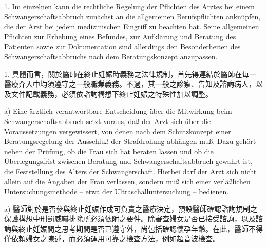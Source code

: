 \documentclass[12pt]{article}
\begin{document}
\begin{sourcepara}[title={原文D.133}]
1. Im einzelnen kann die rechtliche Regelung der Pflichten des Arztes bei einem Schwangerschaftsabbruch zunächst an die allgemeinen Berufspflichten anknüpfen, die der Arzt bei jedem medizinischen Eingriff zu beachten hat. Seine allgemeinen Pflichten zur Erhebung eines Befundes, zur Aufklärung und Beratung des Patienten sowie zur Dokumentation sind allerdings den Besonderheiten des Schwangerschaftsabbruchs nach dem Beratungskonzept anzupassen.
\end{sourcepara}
\begin{transpara}
1. 具體而言，關於醫師在終止妊娠時義務之法律規制，首先得連結於醫師在每一醫療介入中均須遵守之一般職業義務。不過，其一般之診察、告知及諮詢病人，以及文件記載義務，必須依諮詢構想下終止妊娠之特殊性加以調整。
\end{transpara}

\begin{sourcepara}[title={原文D.134}]
a) Eine ärztlich verantwortbare Entscheidung über die Mitwirkung beim Schwangerschaftsabbruch setzt voraus, daß der Arzt sich über die Voraussetzungen vergewissert, von denen nach dem Schutzkonzept einer Beratungsregelung der Ausschluß der Strafdrohung abhängen muß. Dazu gehört neben der Prüfung, ob die Frau sich hat beraten lassen und ob die Überlegungsfrist zwischen Beratung und Schwangerschaftsabbruch gewahrt ist, die Feststellung des Alters der Schwangerschaft. Hierbei darf der Arzt sich nicht allein auf die Angaben der Frau verlassen, sondern muß sich einer verläßlichen Untersuchungsmethode -- etwa der Ultraschalluntersuchung -- bedienen.
\end{sourcepara}
\begin{transpara}
a) 醫師對於是否參與終止妊娠作成可負責之醫療決定，預設醫師確認諮詢規制之保護構想中刑罰威嚇排除所必須依附之要件。除審查婦女是否已接受諮詢，以及諮詢與終止妊娠間之思考期間是否已遵守外，尚包括確認懷孕年齡。在此，醫師不得僅依賴婦女之陳述，而必須運用可靠之檢查方法，例如超音波檢查。
\end{transpara}
\end{document}
